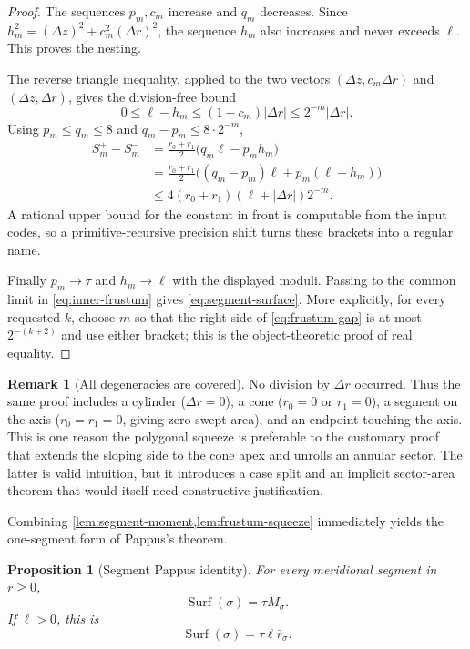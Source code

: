 \documentclass[11pt]{article}
\newtheorem{proposition}[theorem]{Proposition}
\theoremstyle{definition}
\newtheorem{remark}[theorem]{Remark}
\newcommand{\Surf}{\operatorname{Surf}}
\newcommand{\abs}[1]{\left|#1\right|}
\begin{document}
\begin{proof}
The sequences $p_m,c_m$ increase and $q_m$ decreases.  Since
$h_m^2=(\Delta z)^2+c_m^2(\Delta r)^2$, the sequence $h_m$ also increases and
never exceeds $\ell$.  This proves the nesting.

The reverse triangle inequality, applied to the two vectors
$(\Delta z,c_m\Delta r)$ and $(\Delta z,\Delta r)$, gives the division-free
bound
\[
 0\leq\ell-h_m\leq(1-c_m)\abs{\Delta r}
 \leq2^{-m}\abs{\Delta r}.
\]
Using $p_m\leq q_m\leq8$ and $q_m-p_m\leq8\cdot2^{-m}$,
\begin{align*}
 S_m^+-S_m^-
 &=\frac{r_0+r_1}{2}\bigl(q_m\ell-p_mh_m\bigr)\\
 &=\frac{r_0+r_1}{2}
   \bigl((q_m-p_m)\ell+p_m(\ell-h_m)\bigr)\\
 &\leq4(r_0+r_1)(\ell+\abs{\Delta r})2^{-m}.
\end{align*}
A rational upper bound for the constant in front is computable from the input
codes, so a primitive-recursive precision shift turns these brackets into a
regular name.

Finally $p_m\to\tau$ and $h_m\to\ell$ with the displayed moduli.  Passing to
the common limit in \eqref{eq:inner-frustum} gives
\eqref{eq:segment-surface}.  More explicitly, for every requested $k$, choose
$m$ so that the right side of \eqref{eq:frustum-gap} is at most $2^{-(k+2)}$
and use either bracket; this is the object-theoretic proof of real equality.
\end{proof}

\begin{remark}[All degeneracies are covered]
No division by $\Delta r$ occurred.  Thus the same proof includes a cylinder
($\Delta r=0$), a cone ($r_0=0$ or $r_1=0$), a segment on the axis
($r_0=r_1=0$, giving zero swept area), and an endpoint touching the axis.
This is one reason the polygonal squeeze is preferable to the customary proof
that extends the sloping side to the cone apex and unrolls an annular sector.
The latter is valid intuition, but it introduces a case split and an implicit
sector-area theorem that would itself need constructive justification.
\end{remark}

Combining \cref{lem:segment-moment,lem:frustum-squeeze} immediately yields the
one-segment form of Pappus's theorem.

\begin{proposition}[Segment Pappus identity]
\label{prop:segment-pappus}
For every meridional segment in $r\geq0$,
\[
 \Surf(\sigma)=\tau M_\sigma.
\]
If $\ell>0$, this is
\[
 \Surf(\sigma)=\tau\ell\bar r_\sigma.
\]
\end{proposition}
\end{document}
